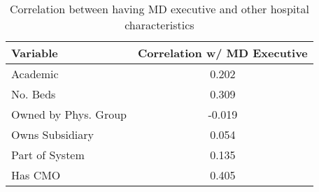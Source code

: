 \begin{table}[ht!]
\centering
\caption{Correlation between having MD executive and other hospital characteristics}
\centering
\begin{tabular}[t]{lc}
\toprule
Variable & Correlation w/ MD Executive\\
\midrule
Academic & 0.202\\
No. Beds & 0.309\\
Owned by Phys. Group & -0.019\\
Owns Subsidiary & 0.054\\
Part of System & 0.135\\
Has CMO & 0.405\\
\bottomrule
\end{tabular}
\end{table}